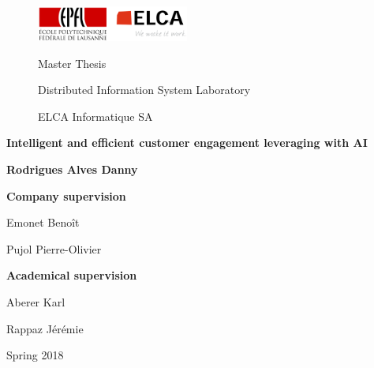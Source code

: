 \begin{titlepage}
	\centering
	
	\begin{figure}[!tbp]
            \centering
            \includegraphics[width=5cm]{images/epfl_elca_logos.png}
            \par
            \vspace{0.2cm}
            Master Thesis \par
            Distributed Information System Laboratory \par
            ELCA Informatique SA \par
            \vspace{3cm}
    \end{figure}
    
    \centering
	{\huge \textbf{Intelligent and efficient customer engagement leveraging with AI}\par}
    \vfill

    \begin{center}
        {\Large \textbf{Rodrigues Alves Danny}\par}
        \vspace{3cm}
        \textbf{Company supervision} \par
        Emonet Benoît \par
        Pujol Pierre-Olivier \par
        \vspace{0.5cm}
        \textbf{Academical supervision} \par
        Aberer Karl  \par
        Rappaz Jérémie  \par
        \vfill
    \end{center}


	{\large Spring 2018\par}

\end{titlepage}